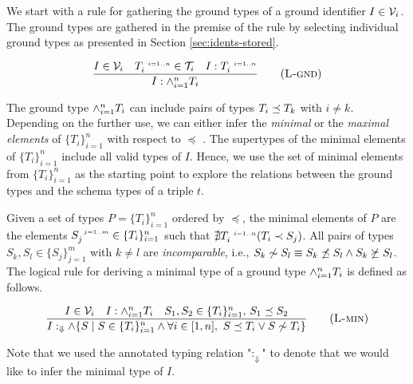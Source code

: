 \documentclass[runningheads]{llncs}
\newcommand{\s}{\scriptscriptstyle\ \,}
\newcommand{\Darr}{\Downarrow}
\newcommand{\V}{{\cal V}}
\newcommand{\TT}{{\cal T}}
\newcommand{\memo}[1]{}
\begin{document}
We start with a rule for gathering the ground types of a ground
identifier $I\in\V_i$. The ground types are gathered in the premise of
the rule by selecting individual ground types as presented in Section
\ref{sec:idents-stored}.

\memo{This is more about just gathering the types and linking them
  with logical operator. Can be used for arbitrarily specific
  types. So, the rule should be called ``gather'' or ``collect''.}

\begin{equation}
\dfrac{I\in\V_i\quad\/T_i^{\s\/i=1..n}\in\TT_i\quad\/I:\/T_i^{\s\/i=1..n}}
      {I:\land_{i=1}^n\/T_i}
\tag{\textsc{L-gnd}}\label{rule:L-gnd}
\end{equation}

The ground type $\land_{i=1}^n\/T_i$ can include pairs of types
$T_i\preceq\/T_k$ with $i\not=k$. Depending on the further use, we can
either infer the \emph{minimal} or the \emph{maximal elements} of
$\{T_i\}_{i=1}^n$ with respect to $\preceq$
\cite{DaveyPriestley2002}. The supertypes of the minimal elements of
$\{T_i\}_{i=1}^n$ include all valid types of $I$. Hence, we use the
set of minimal elements from $\{T_i\}_{i=1}^n$ as the starting point
to explore the relations between the ground types and the schema types
of a triple $t$.

Given a set of types $P=\{T_i\}_{i=1}^n$ ordered by $\preceq$, the
minimal elements of $P$ are the elements
$S_j^{\s\/j=1..m}\in\{T_i\}_{i=1}^n$ such that
${\nexists}\/T_i^{\s\/i=1..n}(T_i\prec\/S_j)$. All pairs of types
$S_k,S_l\in\{S_j\}_{j=1}^m$ with $k\not=l$ are \emph{incomparable},
i.e.,
$S_k\not\sim\/S_l\equiv\/S_k\not\preceq\/S_l\land\/S_k\not\succeq\/S_l$.
The logical rule for deriving a minimal type of a ground type
$\land_{i=1}^n\/T_i$ is defined as follows. 

\begin{equation}
\dfrac{I\in\V_i\quad\/I:\land_{i=1}^n\/T_i\quad\/S_1,S_2\in\{T_i\}_{i=1}^n,\, S_1\preceq\/S_2}
      {I:_\Darr\land \{S \mid S\in\/\{T_i\}_{i=1}^n\land\forall\/i\in[1,n],\ S\preceq\/T_i\lor\/S\not\sim\/T_i\}}
\tag{\textsc{L-min}}\label{rule:L-min}
\end{equation}


Note that we used the annotated typing relation "$:_\Darr$"
to denote that we would like to infer the minimal type of $I$.

\memo{
  The rule says that the types $S$ gathered with the $\land$-type are
the minimal types of a poset of ground types $\{T_i\}_{i=1}^n$. A
particular type $S$ is minimal since all other $T_i$ types are either
more general or equal ($\succeq$), or not related to $S$.}
\end{document}
